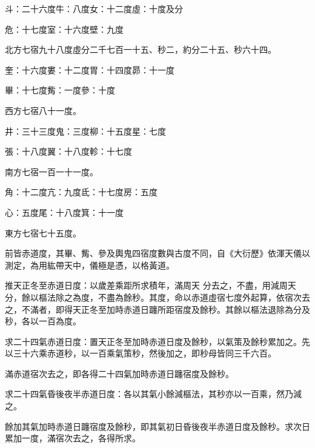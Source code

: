 \begin{pinyinscope}
 斗：二十六度牛：八度女：十二度虛：十度及分



 危：十七度室：十六度壁：九度



 北方七宿九十八度虛分二千七百一十五、秒二，約分二十五、秒六十四。



 奎：十六度婁：十二度胃：十四度昴：十一度



 畢：十七度觜：一度參：十度



 西方七宿八十一度。



 井：三十三度鬼：三度柳：十五度星：七度



 張：十八度翼：十八度軫：十七度



 南方七宿一百一十一度。



 角：十二度亢：九度氐：十七度房：五度



 心：五度尾：十八度箕：十一度



 東方七宿七十五度。



 前皆赤道度，其畢、觜、參及輿鬼四宿度數與古度不同，自《大衍歷》依渾天儀以測定，為用紘帶天中，儀極是憑，以格黃道。



 推天正冬至赤道日度：以歲差乘距所求積年，滿周天
 分去之，不盡，用減周天分，餘以樞法除之為度，不盡為餘秒。其度，命以赤道虛宿七度外起算，依宿次去之，不滿者，即得天正冬至加時赤道日躔所距宿度及餘秒。其餘以樞法退除為分及秒，各以一百為度。



 求二十四氣赤道日度：置天正冬至加時赤道日度及餘秒，以氣策及餘秒累加之。先以三十六乘赤道秒，以一百乘氣策秒，然後加之，即秒母皆同三千六百。



 滿赤道宿次去之，即各得二十四氣加時赤道日躔宿度及餘秒。



 求二十四氣昏後夜半赤道日度：各以其氣小餘減樞法，其秒亦以一百乘，然乃減之。



 餘加其氣加時赤道日躔宿度及餘秒，即其氣初日昏後夜半赤道日度及餘秒。求次日累加一度，滿宿次去之，各得所求。




\end{pinyinscope}
